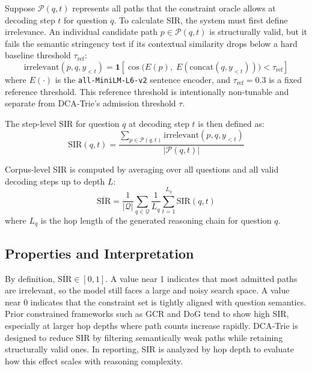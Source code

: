 Suppose $\mathcal{P}(q, t)$ represents all paths that the constraint oracle allows at decoding step $t$ for question $q$. To calculate SIR, the system must first define irrelevance. An individual candidate path $p \in \mathcal{P}(q, t)$ is structurally valid, but it fails the semantic stringency test if its contextual similarity drops below a hard baseline threshold $\tau_{\text{ref}}$:
\begin{equation}
  \text{irrelevant}(p, q, y_{<t}) = \mathbf{1}\!\left[
    \cos\!\bigl(E(p),\; E(\text{concat}(q, y_{<t}))\bigr) < \tau_{\text{ref}}
    \right]
  \label{eq:irrelevant}
\end{equation}
where $E(\cdot)$ is the \texttt{all-MiniLM-L6-v2} sentence encoder, and $\tau_{\text{ref}} = 0.3$ is a fixed reference threshold. This reference threshold is intentionally non-tunable and separate from DCA‑Trie's admission threshold $\tau$.

The step-level SIR for question $q$ at decoding step $t$ is then defined as:
\begin{equation}
  \text{SIR}(q, t) = \frac{\sum_{p \in \mathcal{P}(q,t)}
    \text{irrelevant}(p, q, y_{<t})}{|\mathcal{P}(q, t)|}
  \label{eq:sir_step}
\end{equation}

Corpus-level SIR is computed by averaging over all questions and all valid decoding steps up to depth $L$:
\begin{equation}
  \overline{\text{SIR}} = \frac{1}{|\mathcal{Q}|} \sum_{q \in \mathcal{Q}}
  \frac{1}{L_q} \sum_{t=1}^{L_q} \text{SIR}(q, t)
  \label{eq:sir_aggregate}
\end{equation}
where $L_q$ is the hop length of the generated reasoning chain for question $q$.

\subsection{Properties and Interpretation}

By definition, $\overline{\text{SIR}} \in [0,1]$. A value near 1 indicates that most admitted paths are irrelevant, so the model still faces a large and noisy search space. A value near 0 indicates that the constraint set is tightly aligned with question semantics. Prior constrained frameworks such as GCR and DoG tend to show high SIR, especially at larger hop depths where path counts increase rapidly. DCA‑Trie is designed to reduce SIR by filtering semantically weak paths while retaining structurally valid ones. In reporting, SIR is analyzed by hop depth to evaluate how this effect scales with reasoning complexity.

